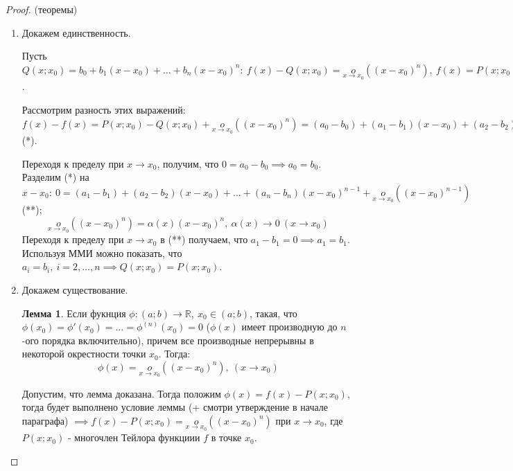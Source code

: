 \documentclass{report}
\theoremstyle{definition}
\newtheorem{lemma}{Лемма}[section]
\begin{document}
\begin{proof}
  (теоремы)
  \begin{enumerate}
    \item Докажем единственность.

          Пусть $Q(x;x_0) = b_0 + b_1(x-x_0) + \ldots + b_n(x-x_0)^n: \ f(x) - Q(x;x_0) = \underset{x\rightarrow
            x_0}{o}((x-x_0)^n), \ f(x) = P(x;x_0) + \underset{x\rightarrow x_0}{o}((x-x_0)^n)$.

          Рассмотрим разность этих выражений: $f(x) - f(x) = P(x;x_0) - Q(x;x_0) + \underset{x\rightarrow x_0}
            {o}((x-x_0)^n) = (a_0 - b_0) + (a_1 - b_1)(x-x_0) + (a_2 - b_2)(x-x_0)^2 + \ldots + (a_n - b_n)
            (x-x_0)^n + \underset{x\rightarrow x_0}{o}((x-x_0)^n)$ (*).

          Переходя к пределу при $x\rightarrow x_0$, получим, что $0 = a_0 - b_0 \implies a_0 = b_0$. Разделим
          (*) на $x-x_0: \ 0 = (a_1 - b_1) + (a_2 - b_2)(x-x_0) + \ldots + (a_n - b_n)(x-x_0)^{n-1} +
            \underset{x\rightarrow x_0}{o}((x-x_0)^{n-1})$ (**);
          \begin{equation*}
            \underset{x\rightarrow x_0}{o}((x-x_0)^{n}) = \alpha(x)(x-x_0)^n, \
            \alpha(x)\rightarrow0 \ (x\rightarrow x_0)
          \end{equation*}
          Переходя к пределу при $x\rightarrow x_0$ в (**) получаем, что $a_1 - b_1 = 0 \implies a_1 = b_1$.
          Используя ММИ можно показать, что $a_i = b_i, \ i = 2,\ldots,n \implies Q(x;x_0) = P(x;x_0)$.
    \item Докажем существование.

          \begin{lemma}
            Если фукнция $\phi:(a;b)\rightarrow\mathbb{R}, \ x_0\in(a;b)$, такая, что $\phi(x_0) = \phi'(x_0)
              = \ldots = \phi^{(n)}(x_0) = 0$ ($\phi(x)$ имеет производную до $n$-ого порядка включительно),
            причем все производные непрерывны в некоторой окрестности точки $x_0$. Тогда:
            \begin{equation*}
              \phi(x) = \underset{x\rightarrow x_0}{o}((x-x_0)^n), \ (x\rightarrow x_0)
            \end{equation*}
          \end{lemma}
          Допустим, что лемма доказана. Тогда положим $\phi(x) = f(x) - P(x;x_0)$, тогда будет выполнено
          условие леммы (+ смотри утверждение в начале параграфа) $\implies f(x) - P(x;x_0) =
            \underset{x\rightarrow x_0}{o}((x-x_0)^n)$ при $x\rightarrow x_0$, где $P(x;x_0)$ -
          многочлен Тейлора функциии $f$ в точке $x_0$.
  \end{enumerate}
\end{proof}
\end{document}
